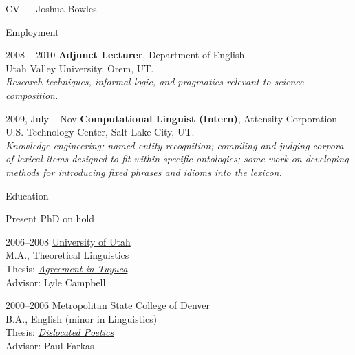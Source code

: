 \begin{cv}{CV --- Joshua Bowles}
\begin{cvlist}{Employment}
\item[2008 -- 2010] {\bf Adjunct Lecturer}, Department of English\\
     Utah Valley University, Orem, UT.\\
		 \textsl{Research techniques, informal logic, and pragmatics relevant to science composition.
					}

\item[2009, July -- Nov] {\bf Computational Linguist (Intern)}, Attensity Corporation\\
     U.S. Technology Center, Salt Lake City, UT.\\
		\textsl{Knowledge engineering; named entity recognition; compiling and judging corpora of lexical
		items designed to fit within specific ontologies; some work on developing methods for introducing
		fixed phrases and idioms into the lexicon.}  
\end{cvlist}

\begin{cvlist}{Education}
                \item[Present] PhD on hold  
                \item[2006--2008] \href{http://www.linguistics.utah.edu/}{University of Utah}\\
                        M.A., Theoretical Linguistics\\
                        Thesis:
												\href{http://content.lib.utah.edu/cdm4/item_viewer.php?CISOROOT=/us-etd2&CISOPTR=1431}{\emph{Agreement in Tuyuca}}\\
												Advisor: Lyle Campbell 
                \item[2000--2006] \href{http://www.mscd.edu/academic/scolas/}{Metropolitan State College of Denver}\\
                        B.A., English (minor in Linguistics)\\
                        Thesis:
												\href{http://sites.google.com/site/bowleslinguistics/Home/research/misc-1/symmetry-1/literature}{\emph{Dislocated Poetics}}\\ 
												Advisor: Paul Farkas 
\end{cvlist}


\end{cv}
